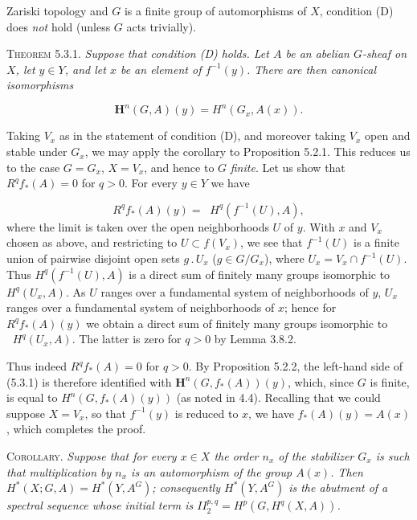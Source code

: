 \clearpage
{}

\noindent Zariski topology and $G$ is a finite group of automorphisms of $X$,
condition (D) does \textit{not} hold (unless $G$ acts trivially).

\textsc{Theorem 5.3.1.} \textit{Suppose that condition (D) holds.
Let $A$ be an abelian $G$-sheaf on $X$, let $y\in Y$, and let $x$ be an
element of $f^{-1}(y)$. There are then canonical isomorphisms}

\[
\mathbf H^n(G,A)(y)=H^n(G_x,A(x)).
\tag{5.3.1}
\]

Taking $V_x$ as in the statement of condition (D), and moreover taking $V_x$
open and stable under $G_x$, we may apply the corollary to Proposition 5.2.1. This
reduces us to the case $G=G_x$, $X=V_x$, and hence to $G$ \textit{finite}.
Let us show that $R^qf_*(A)=0$ for $q>0$. For every $y\in Y$ we have

\[
R^qf_*(A)(y)=\mathop{\underset{\to}{\mathrm{lim.}}} H^q(f^{-1}(U),A),
\]
where the limit is taken over the open neighborhoods $U$ of $y$. With $x$ and
$V_x$ chosen as above, and restricting to $U\subset f(V_x)$, we see that
$f^{-1}(U)$ is a finite union of pairwise disjoint open sets $g\mathbin{.}U_x$
($g\in G/G_x$), where $U_x=V_x\cap f^{-1}(U)$. Thus
$H^q(f^{-1}(U),A)$ is a direct sum of finitely many groups isomorphic to
$H^q(U_x,A)$. As $U$ ranges over a fundamental system of neighborhoods of
$y$, $U_x$ ranges over a fundamental system of neighborhoods of $x$; hence
for $R^qf_*(A)(y)$ we obtain a direct sum of finitely many groups isomorphic to
$\mathop{\underset{\to}{\lim}} H^q(U_x,A)$. The latter is zero for $q>0$ by Lemma 3.8.2.

Thus indeed $R^qf_*(A)=0$ for $q>0$. By Proposition 5.2.2, the left-hand side
of (5.3.1) is therefore identified with $\mathbf H^n(G,f_*(A))(y)$, which,
since $G$ is finite, is equal to $H^n(G,f_*(A)(y))$ (as noted in 4.4).
Recalling that we could suppose $X=V_x$, so that $f^{-1}(y)$ is reduced to
$x$, we have $f_*(A)(y)=A(x)$, which completes the proof.

\textsc{Corollary.} \textit{Suppose that for every $x\in X$ the
order $n_x$ of the stabilizer $G_x$ is such that multiplication by $n_x$ is
an automorphism of the group $A(x)$. Then $H^*(X;G,A)=H^*(Y,A^G)$;
consequently $H^*(Y,A^G)$ is the abutment of a spectral sequence whose
initial term is $II_2^{p,q}=H^p(G,H^q(X,A))$.}

